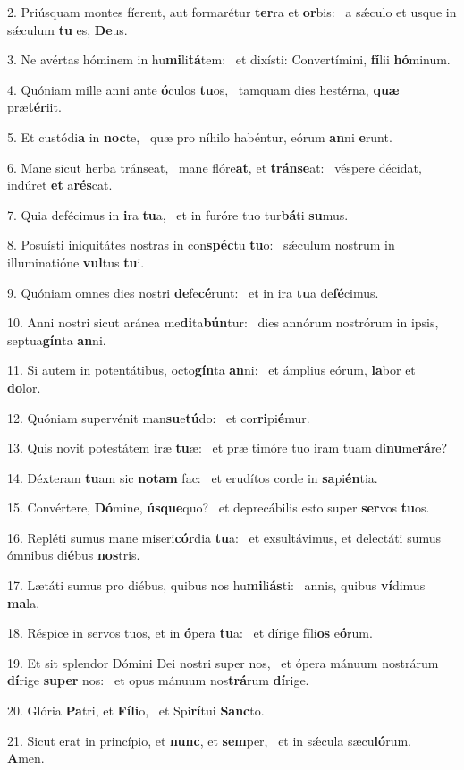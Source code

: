 2. Priúsquam montes fíerent, aut formarétur \textbf{ter}ra et \textbf{or}bis: \ast\  a sǽculo et usque in sǽculum \textbf{tu} es, \textbf{De}us.\

3. Ne avértas hóminem in hu\textbf{mi}li\textbf{tá}tem: \ast\  et dixísti: Convertímini, \textbf{fí}lii \textbf{hó}minum.\

4. Quóniam mille anni ante \textbf{ó}culos \textbf{tu}os, \ast\  tamquam dies hestérna, \textbf{quæ} præ\textbf{tér}iit.\

5. Et custódi\textbf{a} in \textbf{noc}te, \ast\  quæ pro níhilo habéntur, eórum \textbf{an}ni \textbf{e}runt.\

6. Mane sicut herba tránseat, \dag\  mane flóre\textbf{at}, et \textbf{tráns}\textbf{e}at: \ast\  véspere décidat, indúret \textbf{et} a\textbf{rés}cat.\

7. Quia defécimus in \textbf{i}ra \textbf{tu}a, \ast\  et in furóre tuo tur\textbf{bá}ti \textbf{su}mus.\

8. Posuísti iniquitátes nostras in con\textbf{spéc}tu \textbf{tu}o: \ast\  sǽculum nostrum in illuminatióne \textbf{vul}tus \textbf{tu}i.\

9. Quóniam omnes dies nostri \textbf{de}fe\textbf{cé}runt: \ast\  et in ira \textbf{tu}a de\textbf{fé}cimus.\

10. Anni nostri sicut aránea me\textbf{di}ta\textbf{bún}tur: \ast\  dies annórum nostrórum in ipsis, septua\textbf{gín}ta \textbf{an}ni.\

11. Si autem in potentátibus, octo\textbf{gín}ta \textbf{an}ni: \ast\  et ámplius eórum, \textbf{la}bor et \textbf{do}lor.\

12. Quóniam supervénit man\textbf{su}e\textbf{tú}do: \ast\  et cor\textbf{ri}pi\textbf{é}mur.\

13. Quis novit potestátem \textbf{i}ræ \textbf{tu}æ: \ast\  et præ timóre tuo iram tuam di\textbf{nu}me\textbf{rá}re?\

14. Déxteram \textbf{tu}am sic \textbf{no}\textbf{tam} fac: \ast\  et erudítos corde in \textbf{sa}pi\textbf{én}tia.\

15. Convértere, \textbf{Dó}mine, \textbf{ús}\textbf{que}quo? \ast\  et deprecábilis esto super \textbf{ser}vos \textbf{tu}os.\

16. Repléti sumus mane miseri\textbf{cór}dia \textbf{tu}a: \ast\  et exsultávimus, et delectáti sumus ómnibus di\textbf{é}bus \textbf{nos}tris.\

17. Lætáti sumus pro diébus, quibus nos hu\textbf{mi}li\textbf{ás}ti: \ast\  annis, quibus \textbf{ví}dimus \textbf{ma}la.\

18. Réspice in servos tuos, et in \textbf{ó}pera \textbf{tu}a: \ast\  et dírige fíli\textbf{os} e\textbf{ó}rum.\

19. Et sit splendor Dómini Dei nostri super nos, \dag\  et ópera mánuum nostrárum \textbf{dí}rige \textbf{su}\textbf{per} nos: \ast\  et opus mánuum nos\textbf{trá}rum \textbf{dí}rige.\

20. Glória \textbf{Pa}tri, et \textbf{Fí}\textbf{li}o, \ast\  et Spi\textbf{rí}tui \textbf{Sanc}to.\

21. Sicut erat in princípio, et \textbf{nunc}, et \textbf{sem}per, \ast\  et in sǽcula sæcu\textbf{ló}rum. \textbf{A}men.\

